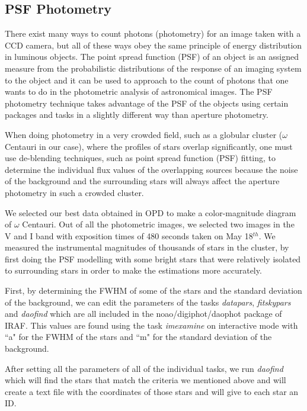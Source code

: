 \subsection{PSF Photometry}

There exist many ways to count photons (photometry) for an image taken with a CCD camera, but all of these ways obey the same principle of energy distribution in luminous objects. The point spread function (PSF) of an object is an assigned measure from the probabilistic distributions of the response of an imaging system to the object and it can be used to approach to the count of photons that one wants to do in the photometric analysis of astronomical images. The PSF photometry technique takes advantage of the PSF of the objects using certain packages and tasks in a slightly different way than aperture photometry.

When doing photometry in a very crowded field, such as a globular cluster ($\omega$ Centauri in our case), where the profiles of stars overlap significantly, one must use de-blending techniques, such as point spread function (PSF) fitting, to determine the individual flux values of the overlapping sources because the noise of the background and the surrounding stars will always affect the aperture photometry in such a crowded cluster. 

We selected our best data obtained in OPD to make a color-magnitude diagram of $\omega$ Centauri. Out of all the photometric images, we selected two images in the V and I band with exposition times of 480 seconds taken on May 18$^{th}$. We measured the instrumental magnitudes of thousands of stars in the cluster, by first doing the PSF modelling with some bright stars that were relatively isolated to surrounding stars in order to make the estimations more accurately.

First, by determining the FWHM of some of the stars and the standard deviation of the background, we can edit the parameters of the tasks \textit{datapars}, \textit{fitskypars} and \textit{daofind} which are all included in the noao/digiphot/daophot package of IRAF. This values are found using the task \textit{imexamine} on interactive mode with ``a" for the FWHM of the stars and ``m" for the standard deviation of the background. 

After setting all the parameters of all of the individual tasks, we run \textit{daofind} which will find the stars that match the criteria we mentioned above and will create a text file with the coordinates of those stars and will give to each star an ID.

